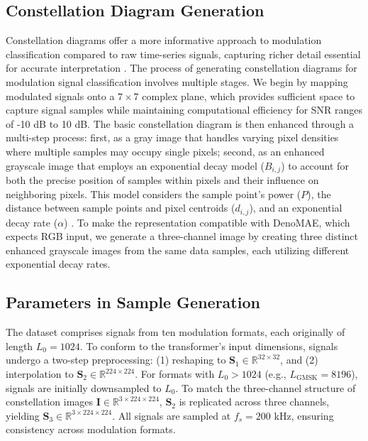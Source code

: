 \subsection{Constellation Diagram Generation}

Constellation diagrams offer a more informative approach to modulation classification compared to raw time-series signals, capturing richer detail essential for accurate interpretation \cite{doan2020learning, 9289413}. The process of generating constellation diagrams for modulation signal classification involves multiple stages. We begin by mapping modulated signals onto a $7 \times 7$ complex plane, which provides sufficient space to capture signal samples while maintaining computational efficiency for SNR ranges of -10 dB to 10 dB. The basic constellation diagram is then enhanced through a multi-step process: first, as a gray image that handles varying pixel densities where multiple samples may occupy single pixels; second, as an enhanced grayscale image that employs an exponential decay model ($B_{i,j}$) to account for both the precise position of samples within pixels and their influence on neighboring pixels. This model considers the sample point's power ($P$), the distance between sample points and pixel centroids ($d_{i,j}$), and an exponential decay rate ($\alpha$) \cite{peng2018modulation}. To make the representation compatible with DenoMAE, which expects RGB input, we generate a three-channel image by creating three distinct enhanced grayscale images from the same data samples, each utilizing different exponential decay rates. 

\subsection{Parameters in Sample Generation} %

The dataset comprises signals from ten modulation formats, each originally of length $L_0 = 1024$. To conform to the transformer's input dimensions, signals undergo a two-step preprocessing: (1) reshaping to $\mathbf{S}_1 \in \mathbb{R}^{32 \times 32}$, and (2) interpolation to $\mathbf{S}_2 \in \mathbb{R}^{224 \times 224}$. For formats with $L_0 > 1024$ (e.g., $L_\text{GMSK} = 8196$), signals are initially downsampled to $L_0$. To match the three-channel structure of constellation images $\mathbf{I} \in \mathbb{R}^{3 \times 224 \times 224}$, $\mathbf{S}_2$ is replicated across three channels, yielding $\mathbf{S}_3 \in \mathbb{R}^{3 \times 224 \times 224}$. All signals are sampled at $f_s = 200$ kHz, ensuring consistency across modulation formats.

